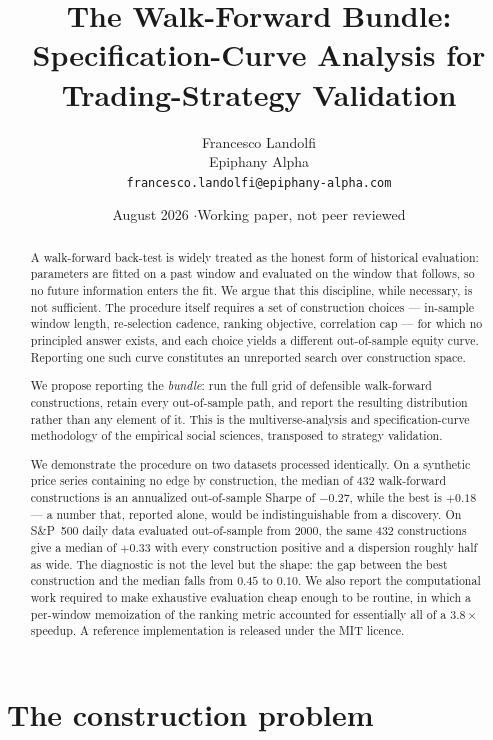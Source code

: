 \documentclass[11pt,a4paper]{article}
\title{\vspace{-1.2cm}\bfseries The Walk-Forward Bundle:\\[2pt]
\large Specification-Curve Analysis for Trading-Strategy Validation}
\author{Francesco Landolfi\\[2pt]
\small Epiphany Alpha\\
\small \texttt{francesco.landolfi@epiphany-alpha.com}}
\date{\small August 2026 \quad$\cdot$\quad Working paper, not peer reviewed}
\begin{document}
\maketitle

\begin{abstract}
\noindent A walk-forward back-test is widely treated as the honest form of
historical evaluation: parameters are fitted on a past window and evaluated on
the window that follows, so no future information enters the fit. We argue that
this discipline, while necessary, is not sufficient. The procedure itself
requires a set of construction choices --- in-sample window length, re-selection
cadence, ranking objective, correlation cap --- for which no principled answer
exists, and each choice yields a different out-of-sample equity curve. Reporting
one such curve constitutes an unreported search over construction space.

We propose reporting the \emph{bundle}: run the full grid of defensible
walk-forward constructions, retain every out-of-sample path, and report the
resulting distribution rather than any element of it. This is the
multiverse-analysis and specification-curve methodology of the empirical
social sciences, transposed to strategy validation.

We demonstrate the procedure on two datasets processed identically. On a
synthetic price series containing no edge by construction, the median of 432
walk-forward constructions is an annualized out-of-sample Sharpe of $-0.27$,
while the best is $+0.18$ --- a number that, reported alone, would be
indistinguishable from a discovery. On S\&P~500 daily data evaluated
out-of-sample from 2000, the same 432 constructions give a median of $+0.33$
with every construction positive and a dispersion roughly half as wide. The
diagnostic is not the level but the shape: the gap between the best
construction and the median falls from $0.45$ to $0.10$. We also report the
computational work required to make exhaustive evaluation cheap enough to be
routine, in which a per-window memoization of the ranking metric accounted for
essentially all of a $3.8\times$ speedup. A reference implementation is released
under the MIT licence.
\end{abstract}

\vspace{0.4em}

\section{The construction problem}
\end{document}
